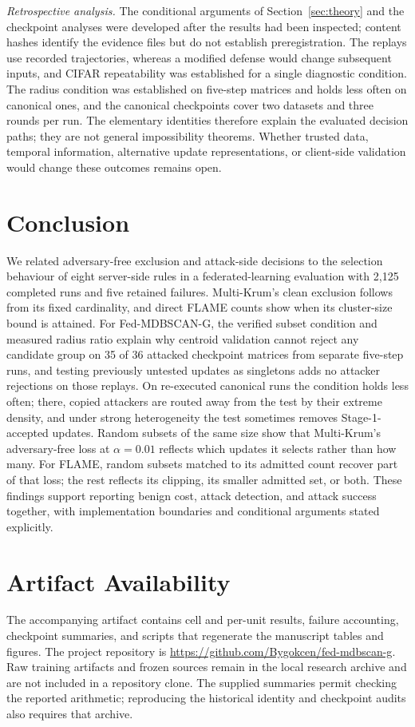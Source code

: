 \documentclass[journal]{IEEEtran}
\newcommand{\method}{Fed-MDBSCAN-G}
\begin{document}
\emph{Retrospective analysis.} The conditional arguments of Section~\ref{sec:theory} and the checkpoint analyses were developed after the results had been inspected; content hashes identify the evidence files but do not establish preregistration. The replays use recorded trajectories, whereas a modified defense would change subsequent inputs, and CIFAR repeatability was established for a single diagnostic condition. The radius condition was established on five-step matrices and holds less often on canonical ones, and the canonical checkpoints cover two datasets and three rounds per run. The elementary identities therefore explain the evaluated decision paths; they are not general impossibility theorems. Whether trusted data, temporal information, alternative update representations, or client-side validation would change these outcomes remains open.

\section{Conclusion}\label{sec:conclusion}
We related adversary-free exclusion and attack-side decisions to the selection behaviour of eight server-side rules in a federated-learning evaluation with 2{,}125 completed runs and five retained failures. Multi-Krum's clean exclusion follows from its fixed cardinality, and direct FLAME counts show when its cluster-size bound is attained. For \method{}, the verified subset condition and measured radius ratio explain why centroid validation cannot reject any candidate group on 35 of 36 attacked checkpoint matrices from separate five-step runs, and testing previously untested updates as singletons adds no attacker rejections on those replays. On re-executed canonical runs the condition holds less often; there, copied attackers are routed away from the test by their extreme density, and under strong heterogeneity the test sometimes removes Stage-1-accepted updates. Random subsets of the same size show that Multi-Krum's adversary-free loss at $\alpha=0.01$ reflects which updates it selects rather than how many. For FLAME, random subsets matched to its admitted count recover part of that loss; the rest reflects its clipping, its smaller admitted set, or both. These findings support reporting benign cost, attack detection, and attack success together, with implementation boundaries and conditional arguments stated explicitly.

\section*{Artifact Availability}
The accompanying artifact contains cell and per-unit results, failure accounting, checkpoint summaries, and scripts that regenerate the manuscript tables and figures. The project repository is \url{https://github.com/Bygokcen/fed-mdbscan-g}. Raw training artifacts and frozen sources remain in the local research archive and are not included in a repository clone. The supplied summaries permit checking the reported arithmetic; reproducing the historical identity and checkpoint audits also requires that archive.
\end{document}
